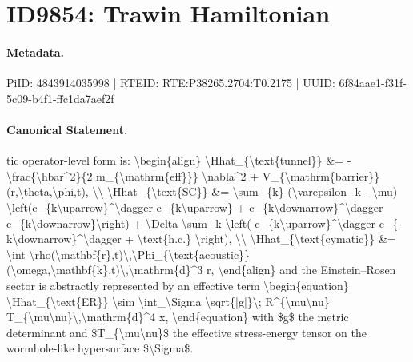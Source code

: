 \section*{ID9854: Trawin Hamiltonian}
\paragraph{Metadata.}
PiID: 4843914035998 | RTEID: RTE:P38265.2704:T0.2175 | UUID: 6f84aae1-f31f-5c09-b4f1-ffc1da7aef2f

\paragraph{Canonical Statement.}
tic operator-level form is: \textbackslash{}begin\{align\} \textbackslash{}Hhat\_\{\textbackslash{}text\{tunnel\}\} \&= -\textbackslash{}frac\{\textbackslash{}hbar\textasciicircum{}2\}\{2 m\_\{\textbackslash{}mathrm\{eff\}\}\} \textbackslash{}nabla\textasciicircum{}2 + V\_\{\textbackslash{}mathrm\{barrier\}\}(r,\textbackslash{}theta,\textbackslash{}phi,t), \textbackslash{}\textbackslash{} \textbackslash{}Hhat\_\{\textbackslash{}text\{SC\}\} \&= \textbackslash{}sum\_\{k\} (\textbackslash{}varepsilon\_k - \textbackslash{}mu) \textbackslash{}left(c\_\{k\textbackslash{}uparrow\}\textasciicircum{}\textbackslash{}dagger c\_\{k\textbackslash{}uparrow\} + c\_\{k\textbackslash{}downarrow\}\textasciicircum{}\textbackslash{}dagger c\_\{k\textbackslash{}downarrow\}\textbackslash{}right) + \textbackslash{}Delta \textbackslash{}sum\_k \textbackslash{}left( c\_\{k\textbackslash{}uparrow\}\textasciicircum{}\textbackslash{}dagger c\_\{-k\textbackslash{}downarrow\}\textasciicircum{}\textbackslash{}dagger + \textbackslash{}text\{h.c.\} \textbackslash{}right), \textbackslash{}\textbackslash{} \textbackslash{}Hhat\_\{\textbackslash{}text\{cymatic\}\} \&= \textbackslash{}int \textbackslash{}rho(\textbackslash{}mathbf\{r\},t)\textbackslash{},\textbackslash{}Phi\_\{\textbackslash{}text\{acoustic\}\}(\textbackslash{}omega,\textbackslash{}mathbf\{k\},t)\textbackslash{},\textbackslash{}mathrm\{d\}\textasciicircum{}3 r, \textbackslash{}end\{align\} and the Einstein--Rosen sector is abstractly represented by an effective term \textbackslash{}begin\{equation\} \textbackslash{}Hhat\_\{\textbackslash{}text\{ER\}\} \textbackslash{}sim \textbackslash{}int\_\textbackslash{}Sigma \textbackslash{}sqrt\{|g|\}\textbackslash{}; R\textasciicircum{}\{\textbackslash{}mu\textbackslash{}nu\} T\_\{\textbackslash{}mu\textbackslash{}nu\}\textbackslash{},\textbackslash{}mathrm\{d\}\textasciicircum{}4 x, \textbackslash{}end\{equation\} with \$g\$ the metric determinant and \$T\_\{\textbackslash{}mu\textbackslash{}nu\}\$ the effective stress-energy tensor on the wormhole-like hypersurface \$\textbackslash{}Sigma\$.

